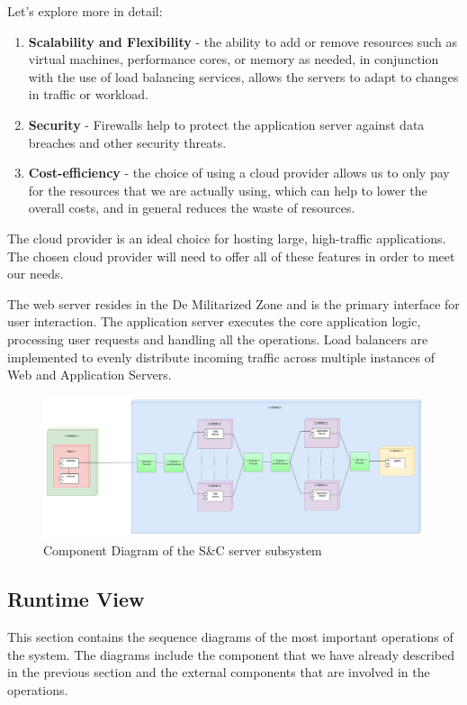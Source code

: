 \documentclass[a4paper,12pt]{article}
\begin{document}
Let's explore more in detail:

\begin{enumerate}
    \item \textbf{Scalability and Flexibility} - the ability to add or remove resources such as virtual machines, performance cores, or memory as needed, in conjunction with the use of load balancing services, allows the servers to adapt to changes in traffic or workload.
    \item \textbf{Security} - Firewalls help to protect the application server against data breaches and other security threats.
    \item \textbf{Cost-efficiency} - the choice of using a cloud provider allows us to only pay for the resources that we are actually using, which can help to lower the overall costs, and in general reduces the waste of resources.
\end{enumerate}

The cloud provider is an ideal choice for hosting large, high-traffic applications. The chosen cloud provider will need to offer all of these features in order to meet our needs.

The web server resides in the De Militarized Zone and is the primary interface for user interaction. The application server executes the core application logic, processing user requests and handling all the operations. Load balancers are implemented to evenly distribute incoming traffic across multiple instances of Web and Application Servers.
\begin{figure}[H]
    \centering
    \includegraphics[scale = 0.33]{DD_figures/SingleDiagrams/DeploymentView.png}
    \caption{Component Diagram of the S\&C server subsystem}
    \centering
\end{figure}


\subsection{Runtime View}
This section contains the sequence diagrams of the most important operations of the
system. The diagrams include the component that we have already described in the
previous section and the external components that are involved in the operations.
\end{document}
